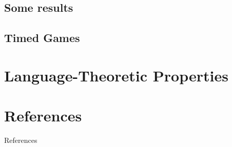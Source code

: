 \documentclass{beamer}
\theoremstyle{definition}
\begin{document}
\subsection{Some results}

\subsection{Timed Games}

\section{Language-Theoretic Properties}

\section{References}
\begin{frame}{References}
  
  
\end{frame}
\end{document}
